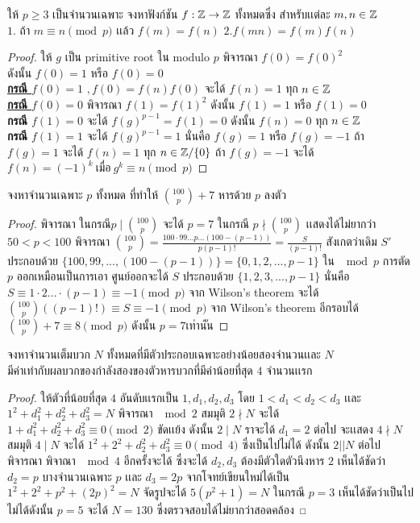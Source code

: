 \documentclass[a4paper,12pt]{scrartcl}
\begin{document}
	\begin{example}
			ให้ $p \ge 3$ เป็นจำนวนเฉพาะ จงหาฟังก์ชัน $f: \mathbb Z \rightarrow \mathbb Z$ ทั้งหมดซึ่ง สำหรับเเต่ละ $m,n \in \mathbb Z$\\ $1.$ ถ้า $m \equiv n \pmod p$ เเล้ว $f(m) = f(n)$ 
			\: $2. f(mn) = f(m)f(n)$ 
	\end{example}
\begin{proof}
	ให้ $g$ เป็น primitive root ใน modulo $p$ พิจารณา $f(0)=f(0)^2$ 
	\\ดังนั้น $f(0) = 1$ หรือ $f(0)=0$ \\
	\underline{\textbf{กรณี $f(0)=1$}} $, f(0)=f(n)f(0)$ จะได้ $f(n)=1$ ทุก $n \in \mathbb Z$ \\
	\underline{\textbf{กรณี $f(0) =0$}} พิจารณา $f(1)=f(1)^2$ 	ดังนั้น $f(1) = 1$ หรือ $f(1)=0$\\	
	\textbf{กรณี $f(1) = 0$} จะได้ $f(g)^{p-1} = f(1) = 0 $ ดังนั้น $f(n)=0$ ทุก $n \in \mathbb Z$ \\
	\textbf{กรณี $f(1) =1$} จะได้ $f(g)^{p-1} = 1$ นั่นคือ $f(g) = 1$ หรือ $f(g)=-1$ ถ้า $f(g)=1$ จะได้ $f(n) = 1$ ทุก $n \in \mathbb Z/\{0\}$ ถ้า $f(g) = -1$ จะได้ $f(n) = (-1)^k \: \text{เมื่อ} \: g^k \equiv n \pmod p$
	
\end{proof}
	\begin{example}
		จงหาจำนวนเฉพาะ $p$ ทั้งหมด ที่ทำให้ ${100 \choose p} + 7$ หารด้วย $p$ ลงตัว
	\end{example} 
	\begin{proof}
		พิจารณา ในกรณี$ p \mid {100 \choose p}$ จะได้ $p=7$ ในกรณี $p\nmid {100 \choose p}$ เเสดงได้ไม่ยากว่า $50<p < 100$  พิจารณา ${100 \choose p} =  \frac{100\cdot99 \dots p \dots  (100-(p-1)) }{p(p-1)!} = \frac{S}{(p-1)!}$ สังเกตว่าเดิม $S'$ ประกอบด้วย $\{100,99,..., (100-(p-1)) \} = \{0,1,2,...,p-1\}$ ใน $\mod p$ การตัด $p$ ออกเหมือนเป็นการเอา ศูนย์ออกจะได้ $S$ ประกอบด้วย $\{1,2,3,...,p-1\}$ นั่นคือ $S \equiv 1\cdot2...\cdot(p-1) \equiv -1 \pmod p$ จาก Wilson's theorem จะได้ ${100 \choose p}((p-1)!) \equiv S \equiv -1 \pmod p$ จาก Wilson's theorem อีกรอบได้ ${100 \choose p}+7 \equiv 8 \pmod p$ ดังนั้น $p=7 เท่านั้น$
	\end{proof}
	\begin{example}
		จงหาจำนวนเต็มบวก $N$ ทั้งหมดที่มีตัวประกอบเฉพาะอย่างน้อยสองจำนวนเเละ $N$\\ มีค่าเท่ากับผลบวกของกำลังสองของตัวหารบวกที่มีค่าน้อยที่สุด $4$ จำนวนเเรก
	\end{example}
	\begin{proof}
		ให้ตัวที่น้อยที่สุด $4$ อันดับเเรกเป็น $1,d_1,d_2,d_3$ โดย $1<d_1<d_2<d_3$ เเละ $1^2+ d_1^2+d_2^2+d_3^2 = N$ พิจารณา $\mod 2$ สมมุติ $2 \nmid N$ จะได้ $1+d_1^2+d_2^2+d_3^2 \equiv 0 \pmod 2 $ ขัดเเย้ง ดังนั้น $2\mid N$ ราจะได้ $d_1 = 2$ ต่อไป จะเเสดง $4 \nmid N $ สมมุติ $4 \mid N$ จะได้ $1^2+2^2+d_2^2+d_3^2 \equiv 0 \pmod 4$  ซึ่งเป็นไปไม่ได้  ดังนั้น $2||N$ ต่อไปพิจารณา พิจาณา $\mod 4$ อีกครั้งจะได้ ซึ่งจะได้ $d_2,d_3$ ต้องมีตัวใดตัวนึงหาร $2$ เห็นได้ชัดว่า $d_2 = p$ บางจำนวนเฉพาะ $p$ เเละ $d_3 = 2p$ จากโจทย์เขียนใหม่ได้เป็น $1^2+2^2+p^2+(2p)^2 = N$ จัดรูปจะได้ $5(p^2+1) = N$ ในกรณี $p=3 $ เห็นได้ชัดว่าเป็นไปไม่ได้ดังนั้น $p = 5$ จะได้ $N=130$ ซึ่งตรวจสอบได้ไม่ยากว่าสอดคล้อง
	\end{proof}
\end{document}
